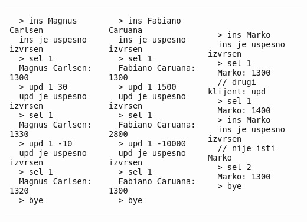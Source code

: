 \documentclass[]{article}
\begin{document}
\begin{enumerate}
\vspace{10pt}
\noindent
\begin{tabular}{lll}
  \begin{lstlisting}
  > ins Magnus Carlsen
  ins je uspesno izvrsen
  > sel 1
  Magnus Carlsen: 1300
  > upd 1 30
  upd je uspesno izvrsen
  > sel 1
  Magnus Carlsen: 1330
  > upd 1 -10
  upd je uspesno izvrsen
  > sel 1
  Magnus Carlsen: 1320
  > bye
  \end{lstlisting}&
  \begin{lstlisting}
  > ins Fabiano Caruana
  ins je uspesno izvrsen
  > sel 1
  Fabiano Caruana: 1300
  > upd 1 1500
  upd je uspesno izvrsen
  > sel 1
  Fabiano Caruana: 2800
  > upd 1 -10000
  upd je uspesno izvrsen
  > sel 1
  Fabiano Caruana: 1300
  > bye
  \end{lstlisting}&
  \begin{lstlisting}
  > ins Marko
  ins je uspesno izvrsen
  > sel 1
  Marko: 1300
  // drugi klijent: upd
  > sel 1 
  Marko: 1400
  > ins Marko
  ins je uspesno izvrsen
  // nije isti Marko
  > sel 2
  Marko: 1300
  > bye
  \end{lstlisting}
\end{tabular}
\end{enumerate}
\end{document}
